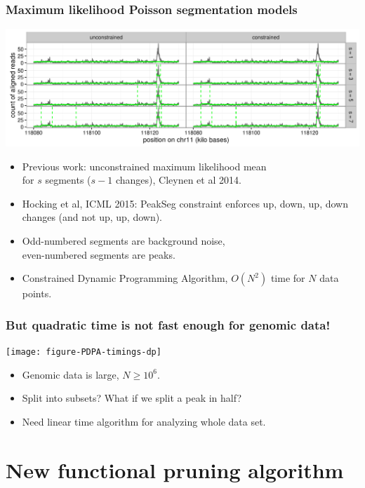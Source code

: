 \documentclass{beamer}
\begin{document}
\begin{frame}
  \frametitle{Maximum likelihood Poisson segmentation models}
  \includegraphics[width=1\textwidth]{figure-Segmentor-PeakSeg}

  \begin{itemize}
  \item Previous work: unconstrained maximum likelihood mean\\
    for $s$ segments ($s-1$ changes), Cleynen et al 2014.
  \item Hocking et al, ICML 2015: PeakSeg constraint enforces up, down, up,
    down changes (and not up, up, down). 
  \item Odd-numbered segments are background noise,\\
    even-numbered segments are peaks.
  \item Constrained Dynamic Programming Algorithm, $O(N^2)$ time for $N$ data points.
  \end{itemize}
\end{frame}

\begin{frame}
  \frametitle{But quadratic time is not fast enough for genomic data!}
  \texttt{[image: figure-PDPA-timings-dp]}
  \begin{itemize}
  \item Genomic data is large, $N \geq 10^6$.
  \item Split into subsets? What if we split a peak in half?
  \item Need linear time algorithm for analyzing whole data set.
  \end{itemize}
\end{frame}

\section{New functional pruning algorithm}
\end{document}
